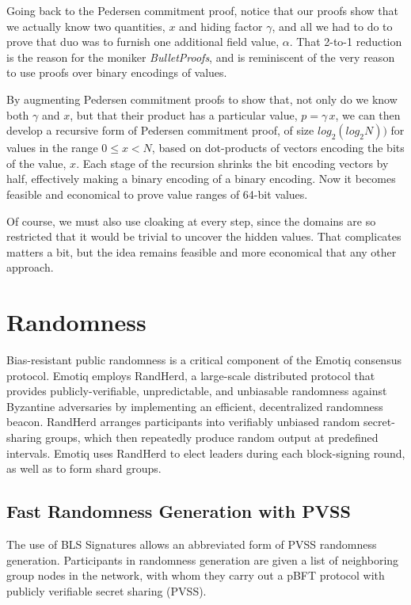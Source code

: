\documentclass{yellowpaper}
\begin{document}
Going back to the Pedersen commitment proof, notice that our proofs show that we actually know two quantities, $x$ and hiding factor $\gamma$, and all we had to do to prove that duo was to furnish one additional field value, $\alpha$. That 2-to-1 reduction is the reason for the moniker {\em{BulletProofs}}, and is reminiscent of the very reason to use proofs over binary encodings of values. 

By augmenting Pedersen commitment proofs to show that, not only do we know both $\gamma$ and $x$, but that their product has a particular value, $p = \gamma \, x$, we can then develop a recursive form of Pedersen commitment proof, of size $log_2(log_2 N))$ for values in the range $0 \le x < N$, based on dot-products of vectors encoding the bits of the value, $x$. Each stage of the recursion shrinks the bit encoding vectors by half, effectively making a binary encoding of a binary encoding. Now it becomes feasible and economical to prove value ranges of 64-bit values.

Of course, we must also use cloaking at every step, since the domains are so restricted that it would be trivial to uncover the hidden values. That complicates matters a bit, but the idea remains feasible and more economical that any other approach.

\section{Randomness}
Bias-resistant public randomness is a critical component of the Emotiq consensus protocol. Emotiq employs RandHerd, a large-scale distributed protocol that provides publicly-verifiable, unpredictable, and unbiasable randomness against Byzantine adversaries by implementing an efficient, decentralized randomness beacon. RandHerd arranges participants into verifiably unbiased random
secret-sharing groups, which then repeatedly produce random output at predefined intervals. Emotiq uses RandHerd to elect leaders during each block-signing round, as well as to form shard groups.
\subsection{Fast Randomness Generation with PVSS}

The use of BLS Signatures allows an abbreviated form of PVSS randomness generation. Participants in randomness generation are given a list of neighboring group nodes in the network, with whom they carry out a pBFT protocol with publicly verifiable secret sharing (PVSS). 
\end{document}
